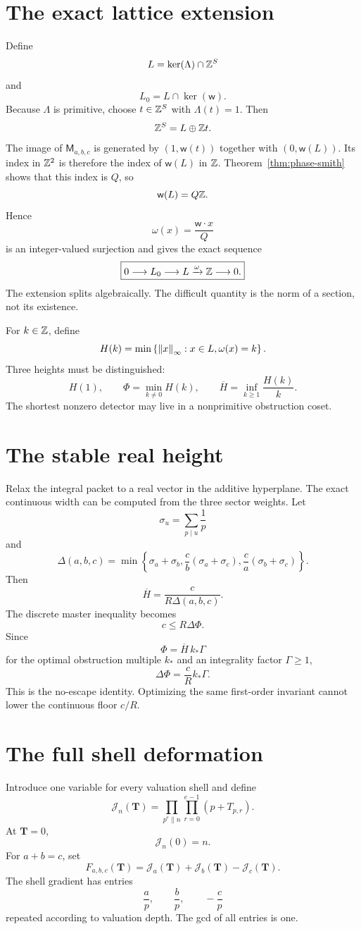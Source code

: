\section{The exact lattice extension}
Define
\[
 L=\ker(\Lambda)\cap\mathbb Z^S
\]
and
\[
 L_0=L\cap\ker(\mathsf w).
\]
Because $\Lambda$ is primitive, choose $t\in\mathbb Z^S$ with $\Lambda(t)=1$. Then
\[
 \mathbb Z^S=L\oplus\mathbb Z t.
\]
The image of $\mathsf M_{a,b,c}$ is generated by $(1,\mathsf w(t))$ together with $(0,\mathsf w(L))$. Its index in $\mathbb Z^2$ is therefore the index of $\mathsf w(L)$ in $\mathbb Z$. Theorem~\ref{thm:phase-smith} shows that this index is $Q$, so
\[
 \mathsf w(L)=Q\mathbb Z.
\]
Hence
\[
 \omega(x)=\frac{\mathsf w\cdot x}{Q}
\]
is an integer-valued surjection and gives the exact sequence
\[
 \boxed{
 0\longrightarrow L_0
 \longrightarrow L
 \xrightarrow{\omega}
 \mathbb Z
 \longrightarrow0.
 }
\]
The extension splits algebraically. The difficult quantity is the norm of a section, not its existence.

For $k\in\mathbb Z$, define
\[
 H(k)
 =
 \min\left\{
 \left\lVert x\right\rVert_\infty:
 x\in L,
 \omega(x)=k
 \right\}.
\]
Three heights must be distinguished:
\[
 H(1),
 \qquad
 \Phi=\min_{k\neq0}H(k),
 \qquad
 \overline H=
 \inf_{k\ge1}\frac{H(k)}k.
\]
The shortest nonzero detector may live in a nonprimitive obstruction coset.

\section{The stable real height}
Relax the integral packet to a real vector in the additive hyperplane. The exact continuous width can be computed from the three sector weights. Let
\[
 \sigma_u=\sum_{p\mid u}\frac1p
\]
and
\[
 \Delta(a,b,c)
 =
 \min\left\{
 \sigma_a+\sigma_b,
 \frac cb(\sigma_a+\sigma_c),
 \frac ca(\sigma_b+\sigma_c)
 \right\}.
\]
Then
\[
 \boxed{
 \overline H
 =
 \frac{c}{R\Delta(a,b,c)}.
 }
\]
The discrete master inequality becomes
\[
 c\le R\Delta\Phi.
\]
Since
\[
 \Phi=\overline H\,k_*\Gamma
\]
for the optimal obstruction multiple $k_*$ and an integrality factor $\Gamma\ge1$,
\[
 \boxed{
 \Delta\Phi
 =
 \frac cR k_*\Gamma.
 }
\]
This is the no-escape identity. Optimizing the same first-order invariant cannot lower the continuous floor $c/R$.

\section{The full shell deformation}
Introduce one variable for every valuation shell and define
\[
 \mathscr J_n(\mathbf T)
 =
 \prod_{p^e\parallel n}
 \prod_{r=0}^{e-1}(p+T_{p,r}).
\]
At $\mathbf T=0$,
\[
 \mathscr J_n(0)=n.
\]
For $a+b=c$, set
\[
 F_{a,b,c}(\mathbf T)
 =
 \mathscr J_a(\mathbf T)
 +
 \mathscr J_b(\mathbf T)
 -
 \mathscr J_c(\mathbf T).
\]
The shell gradient has entries
\[
 \frac ap,
 \qquad
 \frac bp,
 \qquad
 -\frac cp
\]
repeated according to valuation depth. The gcd of all entries is one.

